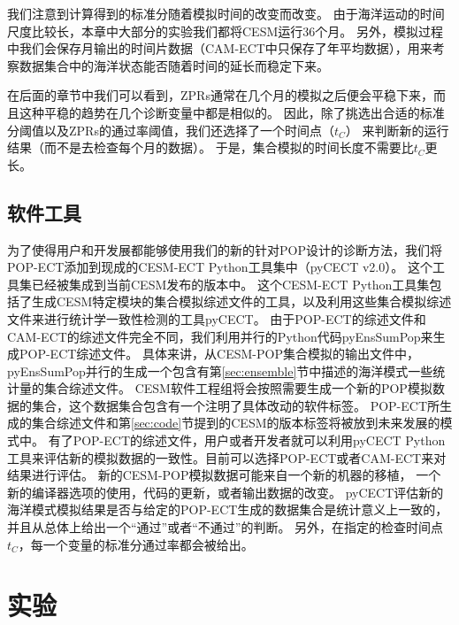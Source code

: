  
我们注意到计算得到的标准分随着模拟时间的改变而改变。 
由于海洋运动的时间尺度比较长，本章中大部分的实验我们都将CESM运行36个月。
另外，模拟过程中我们会保存月输出的时间片数据（CAM-ECT中只保存了年平均数据），用来考察数据集合中的海洋状态能否随着时间的延长而稳定下来。 



在后面的章节中我们可以看到，ZPRs通常在几个月的模拟之后便会平稳下来，而且这种平稳的趋势在几个诊断变量中都是相似的。 
因此，除了挑选出合适的标准分阈值以及ZPRs的通过率阈值，我们还选择了一个时间点（$t_C$）
来判断新的运行结果（而不是去检查每个月的数据）。 
于是，集合模拟的时间长度不需要比$t_C$更长。 

\subsection{软件工具}

为了使得用户和开发展都能够使用我们的新的针对POP设计的诊断方法，我们将POP-ECT添加到现成的CESM-ECT Python工具集中（pyCECT v2.0）。
这个工具集已经被集成到当前CESM发布的版本中。 
这个CESM-ECT Python工具集包括了生成CESM特定模块的集合模拟综述文件的工具，以及利用这些集合模拟综述文件来进行统计学一致性检测的工具pyCECT。
由于POP-ECT的综述文件和CAM-ECT的综述文件完全不同，我们利用并行的Python代码pyEnsSumPop来生成POP-ECT综述文件。
具体来讲，从CESM-POP集合模拟的输出文件中，pyEnsSumPop并行的生成一个包含有第\ref{sec:ensemble}节中描述的海洋模式一些统计量的集合综述文件。 
CESM软件工程组将会按照需要生成一个新的POP模拟数据的集合，这个数据集合包含有一个注明了具体改动的软件标签。
POP-ECT所生成的集合综述文件和第\ref{sec:code}节提到的CESM的版本标签将被放到未来发展的模式中。 
有了POP-ECT的综述文件，用户或者开发者就可以利用pyCECT Python工具来评估新的模拟数据的一致性。目前可以选择POP-ECT或者CAM-ECT来对结果进行评估。
新的CESM-POP模拟数据可能来自一个新的机器的移植， 一个新的编译器选项的使用，代码的更新，或者输出数据的改变。
pyCECT评估新的海洋模式模拟结果是否与给定的POP-ECT生成的数据集合是统计意义上一致的，并且从总体上给出一个“通过”或者“不通过”的判断。
另外，在指定的检查时间点$t_C$，每一个变量的标准分通过率都会被给出。 

\section{实验} \label{sec:exp}

